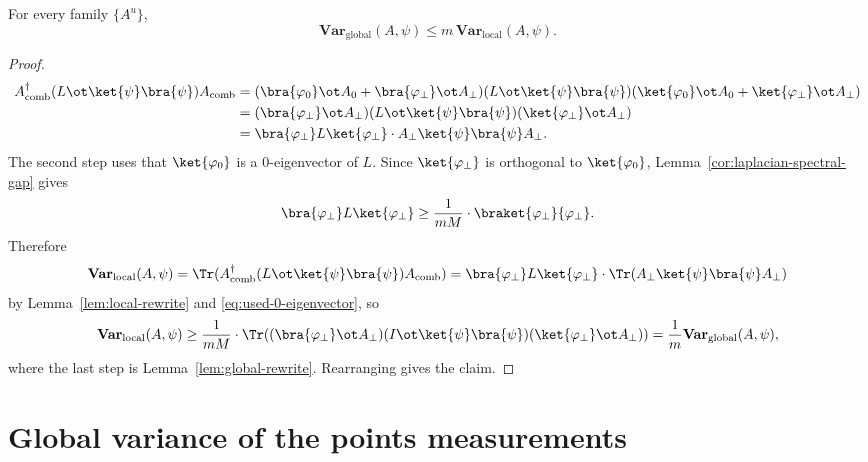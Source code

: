 \begin{lemma}\label{lem:local-to-global}
	\leanok
	For every family $\{A^u\}$,
	\[
		\mathbf{Var}_{\mathrm{global}}(A,\psi) \le m\, \mathbf{Var}_{\mathrm{local}}(A,\psi).
	\]
\end{lemma}
\begin{proof}
	\leanok
	\begin{equation}
		\begin{aligned}
			A_{\mathrm{comb}}^\dagger (L \ot \ket{\psi}\bra{\psi}) A_{\mathrm{comb}}
			 & =
			(\bra{\varphi_0}\ot A_0+\bra{\varphi_\perp}\ot A_\perp)(L \ot \ket{\psi}\bra{\psi})(\ket{\varphi_0}\ot A_0+\ket{\varphi_\perp}\ot A_\perp) \\
			 & =
			(\bra{\varphi_\perp}\ot A_\perp)(L \ot \ket{\psi}\bra{\psi})(\ket{\varphi_\perp}\ot A_\perp)                                               \\
			 & =
			\bra{\varphi_\perp}L\ket{\varphi_\perp} \cdot A_\perp \ket{\psi}\bra{\psi} A_\perp.
		\end{aligned}
		\label{eq:used-0-eigenvector}
	\end{equation}
	The second step uses that $\ket{\varphi_0}$ is a $0$-eigenvector of $L$. Since $\ket{\varphi_\perp}$ is orthogonal to $\ket{\varphi_0}$, Lemma~\ref{cor:laplacian-spectral-gap} gives
	\[
		\bra{\varphi_\perp}L\ket{\varphi_\perp}
		\ge
		\frac{1}{mM} \cdot \braket{\varphi_\perp}{\varphi_\perp}.
	\]
	Therefore
	\[
		\mathbf{Var}_{\mathrm{local}}(A,\psi)
		=
		\Tr(A_{\mathrm{comb}}^\dagger (L \ot \ket{\psi}\bra{\psi}) A_{\mathrm{comb}})
		=
		\bra{\varphi_\perp}L\ket{\varphi_\perp} \cdot \Tr(A_\perp \ket{\psi}\bra{\psi} A_\perp)
	\]
	by Lemma~\ref{lem:local-rewrite} and \eqref{eq:used-0-eigenvector}, so
	\[
		\mathbf{Var}_{\mathrm{local}}(A,\psi)
		\ge
		\frac{1}{mM} \cdot \Tr((\bra{\varphi_\perp}\ot A_\perp)(I\ot \ket{\psi}\bra{\psi})(\ket{\varphi_\perp}\ot A_\perp))
		=
		\frac{1}{m}\mathbf{Var}_{\mathrm{global}}(A,\psi),
	\]
	where the last step is Lemma~\ref{lem:global-rewrite}. Rearranging gives the claim.
\end{proof}


\chapter{Global variance of the points measurements}
\label{chap:variance}
\label{sec:variance}

